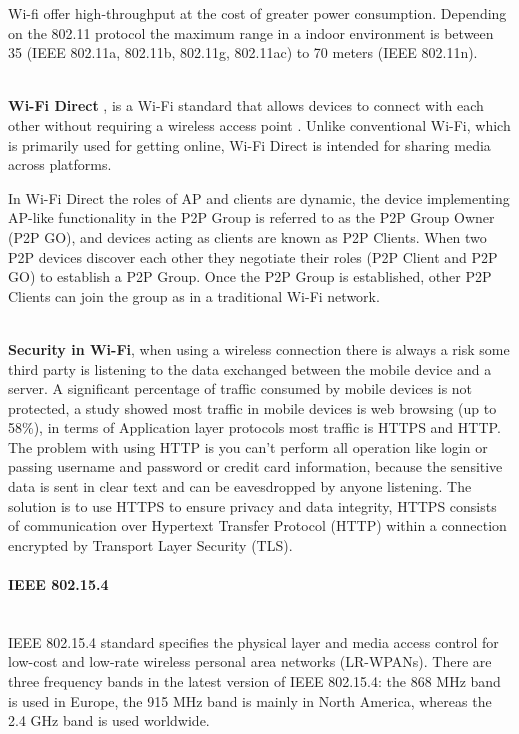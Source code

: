 Wi-fi offer high-throughput at the cost of greater power consumption. Depending on the 802.11 protocol the maximum range in a indoor environment is between 35 (IEEE 802.11a, 802.11b, 802.11g, 802.11ac) to 70 meters (IEEE 802.11n).

\mbox{}\\
\textbf{Wi-Fi Direct} \cite{wifi_direct,wifi_direct2},  is a Wi-Fi standard that allows devices to connect with each other without requiring a wireless access point .
Unlike conventional Wi-Fi, which is primarily used for getting online, Wi-Fi Direct is intended for sharing media across platforms.

In Wi-Fi Direct the roles of AP and clients are dynamic, the device implementing AP-like functionality in the P2P Group is referred to as the P2P Group Owner (P2P GO), and devices acting as clients are known as P2P Clients. When two P2P devices discover each other they negotiate their roles (P2P Client and P2P GO) to establish a P2P Group. Once the P2P Group is established, other P2P Clients can join the group as in a traditional Wi-Fi network.

\mbox{}\\
\textbf{Security in Wi-Fi}, when using a wireless connection there is always a risk some third party is listening to the data exchanged between the mobile device and a server. A significant percentage of traffic consumed by mobile devices is not protected, a study\cite{internet_traffic} showed most traffic in mobile devices is web browsing (up to 58\%), in terms of Application layer protocols most traffic is HTTPS and HTTP.
The problem with using HTTP is you can't perform all operation like login or passing username and password or credit card information, because the sensitive data is sent in clear text and can be eavesdropped by anyone listening. The solution is to use HTTPS to ensure privacy and data integrity, HTTPS consists of communication over Hypertext Transfer Protocol (HTTP) within a connection encrypted by Transport Layer Security (TLS).



\paragraph{IEEE 802.15.4}\mbox{}\\

IEEE 802.15.4 standard\cite{livro_zigbee} specifies the physical layer and media access control for  low-cost and low-rate wireless personal area networks (LR-WPANs).
There are three frequency bands in the latest version of IEEE 802.15.4: the 868 MHz band is used in Europe, the 915 MHz band is mainly in North America, whereas the 2.4 GHz band is used worldwide.

